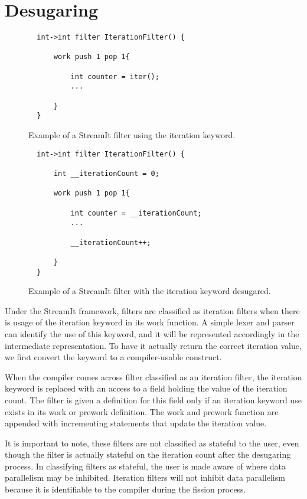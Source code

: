 \section{Desugaring}

\begin{figure}[t]
{\eightpoint
\begin{verbatim}
  int->int filter IterationFilter() {

      work push 1 pop 1{

          int counter = iter();
          ...

      }
  }
\end{verbatim}
\caption{Example of a StreamIt filter using the iteration keyword.\protect\label{fig:iter-filter-example}}}
\end{figure}


\begin{figure}[t]
{\eightpoint
\begin{verbatim}
  int->int filter IterationFilter() {

      int __iterationCount = 0;      

      work push 1 pop 1{

          int counter = __iterationCount;
          ...

          __iterationCount++;

      }
  }
\end{verbatim}
\caption{Example of a StreamIt filter with the iteration keyword desugared.\protect\label{fig:desugar-filter-example}}}
\end{figure}


Under the StreamIt framework, filters are classified as iteration filters when there is usage of the iteration keyword in its work function.  A simple lexer and parser can identify the use of this keyword, and it will be represented accordingly in the intermediate representation.  To have it actually return the correct iteration value, we first convert the keyword to a compiler-usable construct.

When the compiler comes across filter classified as an iteration filter, the iteration keyword is replaced with an access to a field holding the value of the iteration count.  The filter is given a definition for this field only if an iteration keyword use exists in its work or prework definition.  The work and prework function are appended with incrementing statements that update the iteration value.

It is important to note, these filters are not classified as stateful to the user, even though the filter is actually stateful on the iteration count after the desugaring process.  In classifying filters as stateful, the user is made aware of where data parallelism may be inhibited.  Iteration filters will not inhibit data parallelism because it is identifiable to the compiler during the fission process.   
